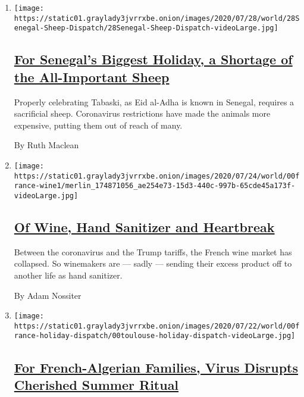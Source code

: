 \begin{enumerate}
\def\labelenumi{\arabic{enumi}.}
\item
  \texttt{[image: https://static01.graylady3jvrrxbe.onion/images/2020/07/28/world/28Senegal-Sheep-Dispatch/28Senegal-Sheep-Dispatch-videoLarge.jpg]}

  \hypertarget{for-senegals-biggest-holiday-a-shortage-of-the-all-important-sheep}{%
  \subsection{\texorpdfstring{\href{/2020/07/29/world/africa/senegal-tabaski-sheep-eid-adha.html}{For
  Senegal's Biggest Holiday, a Shortage of the All-Important
  Sheep}}{For Senegal's Biggest Holiday, a Shortage of the All-Important Sheep}}\label{for-senegals-biggest-holiday-a-shortage-of-the-all-important-sheep}}

  Properly celebrating Tabaski, as Eid al-Adha is known in Senegal,
  requires a sacrificial sheep. Coronavirus restrictions have made the
  animals more expensive, putting them out of reach of many.

  By Ruth Maclean
\item
  \texttt{[image: https://static01.graylady3jvrrxbe.onion/images/2020/07/24/world/00france-wine1/merlin\_174871056\_ae254e73-15d3-440c-997b-65cde45a173f-videoLarge.jpg]}

  \hypertarget{of-wine-hand-sanitizer-and-heartbreak}{%
  \subsection{\texorpdfstring{\href{/2020/07/27/world/europe/france-alsace-wine-coronavirus.html}{Of
  Wine, Hand Sanitizer and
  Heartbreak}}{Of Wine, Hand Sanitizer and Heartbreak}}\label{of-wine-hand-sanitizer-and-heartbreak}}

  Between the coronavirus and the Trump tariffs, the French wine market
  has collapsed. So winemakers are --- sadly --- sending their excess
  product off to another life as hand sanitizer.

  By Adam Nossiter
\item
  \texttt{[image: https://static01.graylady3jvrrxbe.onion/images/2020/07/22/world/00france-holiday-dispatch/00toulouse-holiday-dispatch-videoLarge.jpg]}

  \hypertarget{for-french-algerian-families-virus-disrupts-cherished-summer-ritual}{%
  \subsection{\texorpdfstring{\href{/2020/07/26/world/europe/france-algeria-summer-vacations.html}{For
  French-Algerian Families, Virus Disrupts Cherished Summer
  Ritual}}{For French-Algerian Families, Virus Disrupts Cherished Summer Ritual}}\label{for-french-algerian-families-virus-disrupts-cherished-summer-ritual}}


\end{enumerate}
